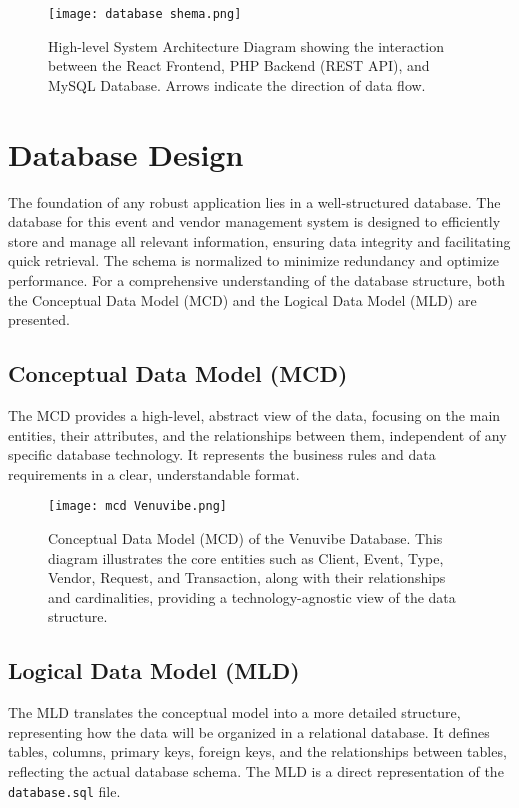 \documentclass{report}
\begin{document}
\begin{figure}[htbp]
    \centering
    \texttt{[image: database shema.png]} %
    \caption{High-level System Architecture Diagram showing the interaction between the React Frontend, PHP Backend (REST API), and MySQL Database. Arrows indicate the direction of data flow.}
    \label{fig:system_architecture_diagram}
\end{figure}

\section{Database Design}
\label{sec:database_design}
The foundation of any robust application lies in a well-structured database. The database for this event and vendor management system is designed to efficiently store and manage all relevant information, ensuring data integrity and facilitating quick retrieval. The schema is normalized to minimize redundancy and optimize performance. For a comprehensive understanding of the database structure, both the Conceptual Data Model (MCD) and the Logical Data Model (MLD) are presented.

\subsection{Conceptual Data Model (MCD)}
The MCD provides a high-level, abstract view of the data, focusing on the main entities, their attributes, and the relationships between them, independent of any specific database technology. It represents the business rules and data requirements in a clear, understandable format.

\begin{figure}[htbp]
    \centering
    \texttt{[image: mcd Venuvibe.png]} %
    \caption{Conceptual Data Model (MCD) of the Venuvibe Database. This diagram illustrates the core entities such as Client, Event, Type, Vendor, Request, and Transaction, along with their relationships and cardinalities, providing a technology-agnostic view of the data structure.}
    \label{fig:mcd_diagram}
\end{figure}

\subsection{Logical Data Model (MLD)}
The MLD translates the conceptual model into a more detailed structure, representing how the data will be organized in a relational database. It defines tables, columns, primary keys, foreign keys, and the relationships between tables, reflecting the actual database schema. The MLD is a direct representation of the \texttt{database.sql} file.
\end{document}
